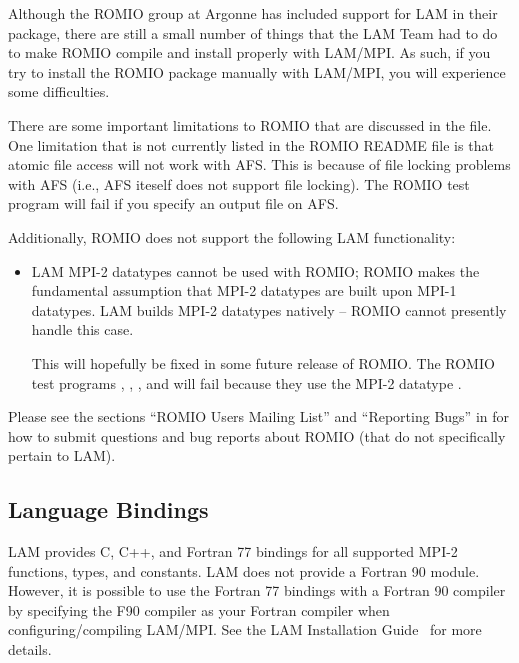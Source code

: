 Although the ROMIO group at Argonne has included support for LAM in
their package, there are still a small number of things that the LAM
Team had to do to make ROMIO compile and install properly with
LAM/MPI.  As such, if you try to install the ROMIO package manually
with LAM/MPI, you will experience some difficulties.

There are some important limitations to ROMIO that are discussed in
the  file.
%
One limitation that is not currently listed in the ROMIO README file
is that atomic file access will not work with AFS.  This is because of
file locking problems with AFS (i.e., AFS iteself does not support
file locking).  The ROMIO test program  will fail if
you specify an output file on AFS.

Additionally, ROMIO does not support the following LAM functionality:

\begin{itemize}
\item LAM MPI-2 datatypes cannot be used with ROMIO; ROMIO makes the
  fundamental assumption that MPI-2 datatypes are built upon MPI-1
  datatypes.  LAM builds MPI-2 datatypes natively -- ROMIO cannot
  presently handle this case.
  
  This will hopefully be fixed in some future release of ROMIO.  The
  ROMIO test programs , ,
  , and  will fail because they
  use the MPI-2 datatype .
\end{itemize}

Please see the sections ``ROMIO Users Mailing List'' and ``Reporting
Bugs'' in  for how to submit questions and bug
reports about ROMIO (that do not specifically pertain to LAM).


\subsection{Language Bindings}

LAM provides C, C++, and Fortran 77 bindings for all supported MPI-2
functions, types, and constants.  LAM does not provide a Fortran 90
module.
%
However, it is possible to use the Fortran 77 bindings with a Fortran
90 compiler by specifying the F90 compiler as your Fortran compiler
when configuring/compiling LAM/MPI.  See the LAM Installation
Guide~\cite{lamteam03:_lam_mpi_install_guide} for more details.

